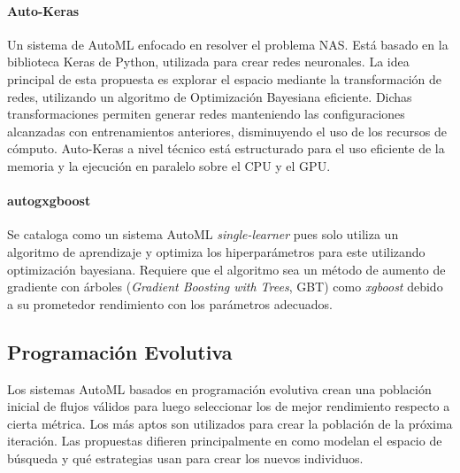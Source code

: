 \paragraph*{Auto-Keras } Un sistema de AutoML enfocado en resolver el problema NAS. Est\'a basado en la biblioteca Keras de Python, utilizada para crear redes neuronales.  La idea principal de esta propuesta es explorar el espacio mediante la transformaci\'on de redes, utilizando un algoritmo de Optimizaci\'on Bayesiana eficiente. Dichas transformaciones permiten generar redes manteniendo las configuraciones alcanzadas con entrenamientos anteriores, disminuyendo el uso de los recursos de c\'omputo. Auto-Keras a nivel t\'ecnico est\'a estructurado para el uso eficiente de la memoria y la ejecuci\'on en paralelo sobre el CPU y el GPU.

\paragraph*{autogxgboost } Se cataloga como un sistema AutoML \textit {single-learner} pues solo utiliza un algoritmo de aprendizaje y optimiza los hiperpar\'ametros para este utilizando optimizaci\'on bayesiana. Requiere que el algoritmo sea un m\'etodo de aumento de gradiente con \'arboles (\textit{Gradient Boosting with Trees}, GBT) como \textit {xgboost}  debido a su prometedor rendimiento con los par\'ametros adecuados.   
    
\subsection{Programaci\'on Evolutiva}
     Los sistemas AutoML basados en programaci\'on evolutiva crean una poblaci\'on inicial de flujos v\'alidos para luego seleccionar los de mejor rendimiento respecto a cierta m\'etrica. Los m\'as aptos son utilizados para crear la poblaci\'on de la pr\'oxima iteraci\'on. Las propuestas difieren principalmente en como modelan el espacio de b\'usqueda y qu\'e estrategias usan para crear los nuevos individuos.
     
